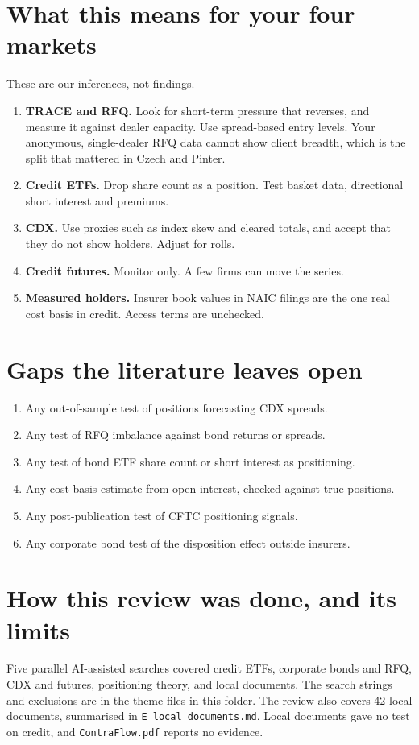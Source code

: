 \documentclass[11pt]{article}
\begin{document}
\section{What this means for your four markets}
These are our inferences, not findings.
\begin{enumerate}
\item \textbf{TRACE and RFQ.} Look for short-term pressure that reverses, and measure it against dealer capacity. Use spread-based entry levels. Your anonymous, single-dealer RFQ data cannot show client breadth, which is the split that mattered in Czech and Pinter.
\item \textbf{Credit ETFs.} Drop share count as a position. Test basket data, directional short interest and premiums.
\item \textbf{CDX.} Use proxies such as index skew and cleared totals, and accept that they do not show holders. Adjust for rolls.
\item \textbf{Credit futures.} Monitor only. A few firms can move the series.
\item \textbf{Measured holders.} Insurer book values in NAIC filings are the one real cost basis in credit. Access terms are unchecked.
\end{enumerate}

\section{Gaps the literature leaves open}
\begin{enumerate}
\item Any out-of-sample test of positions forecasting CDX spreads.
\item Any test of RFQ imbalance against bond returns or spreads.
\item Any test of bond ETF share count or short interest as positioning.
\item Any cost-basis estimate from open interest, checked against true positions.
\item Any post-publication test of CFTC positioning signals.
\item Any corporate bond test of the disposition effect outside insurers.
\end{enumerate}

\section{How this review was done, and its limits}
Five parallel AI-assisted searches covered credit ETFs, corporate bonds and RFQ, CDX and futures, positioning theory, and local documents. The search strings and exclusions are in the theme files in this folder. The review also covers 42 local documents, summarised in \texttt{E\_local\_documents.md}. Local documents gave no test on credit, and \texttt{ContraFlow.pdf} reports no evidence.
\end{document}
